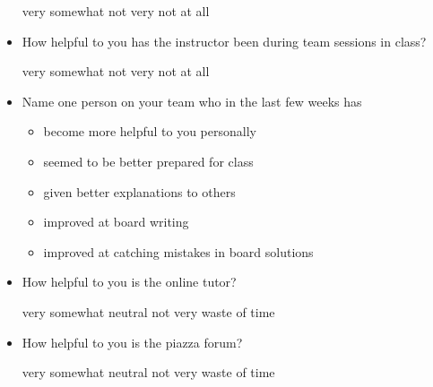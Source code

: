 \documentclass[handout]{mcs}
\begin{document}
\begin{itemize}
\begin{center}
very\hspace{0.5in} somewhat \hspace{0.5in} not very \hspace{0.5in} not at all
\end{center}

\item How helpful to you has the instructor been during team sessions in class?

\begin{center}
very\hspace{0.5in} somewhat \hspace{0.5in} not very \hspace{0.5in} not at all
\end{center}


\item Name one person on your team who in the last few weeks has
  \begin{itemize}
    \item become more helpful to you personally \hfill\examrule[2in]
    \item seemed to be better prepared for class\hfill\examrule[2in]
    \item given better explanations to others\hfill\examrule[2in]
    \item improved at board writing\hfill\examrule[2in]
    \item improved at catching mistakes in board solutions\hfill\examrule[2in]
  \end{itemize}


\item How helpful to you is the online tutor?

\begin{center}
very\hspace{0.5in} somewhat \hspace{0.5in} neutral\hspace{0.5in} not
very \hspace{0.5in} waste of time
\end{center}

\item How helpful to you is the piazza forum?

\begin{center}
very\hspace{0.5in} somewhat \hspace{0.5in} neutral\hspace{0.5in} not
very \hspace{0.5in} waste of time
\end{center}



\end{itemize}
\end{document}
